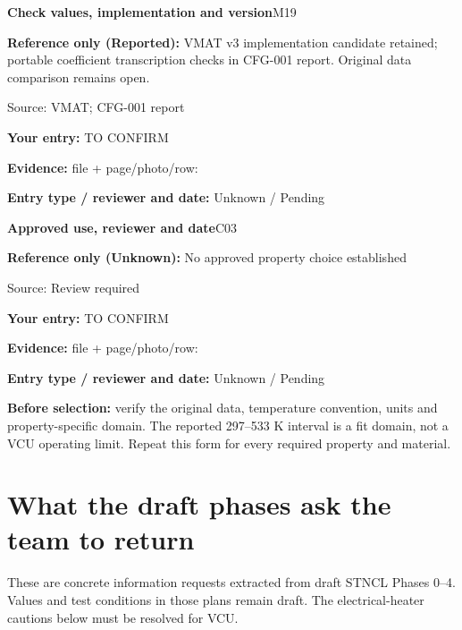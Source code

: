 \documentclass[11pt]{article}
\newcommand{\notebox}[1]{\par\noindent\colorbox{pale}{\parbox{\dimexpr\linewidth-2\fboxsep\relax}{#1}}\par}
\begin{document}
\par\noindent\begin{minipage}{\textwidth}\small
{\color{navy}\bfseries Check values, implementation and version}\hfill M19\par
\colorbox{pale}{\parbox{\dimexpr\linewidth-2\fboxsep\relax}{
\textbf{Reference only (Reported):} VMAT v3 implementation candidate retained; portable coefficient transcription checks in CFG-001 report. Original data comparison remains open.\par
{\footnotesize Source: VMAT; CFG-001 report}}}\par
\textbf{Your entry:} {\color{muted}TO CONFIRM}\enspace\hrulefill\par
{\footnotesize\textbf{Evidence:} file + page/photo/row: \hrulefill\par
\textbf{Entry type / reviewer and date:} Unknown / Pending\par
}\end{minipage}\par\vspace{5pt}
\par\noindent\begin{minipage}{\textwidth}\small
{\color{navy}\bfseries Approved use, reviewer and date}\hfill C03\par
\colorbox{pale}{\parbox{\dimexpr\linewidth-2\fboxsep\relax}{
\textbf{Reference only (Unknown):} No approved property choice established\par
{\footnotesize Source: Review required}}}\par
\textbf{Your entry:} {\color{muted}TO CONFIRM}\enspace\hrulefill\par
{\footnotesize\textbf{Evidence:} file + page/photo/row: \hrulefill\par
\textbf{Entry type / reviewer and date:} Unknown / Pending\par
}\end{minipage}\par\vspace{5pt}
\notebox{\textbf{Before selection:} verify the original data, temperature convention, units and property-specific domain. The reported 297--533 K interval is a fit domain, not a VCU operating limit. Repeat this form for every required property and material.}
\clearpage\section{What the draft phases ask the team to return}\label{phase-requests}
These are concrete information requests extracted from draft STNCL Phases 0--4. Values and test conditions in those plans remain draft. The electrical-heater cautions below must be resolved for VCU.
\end{document}
